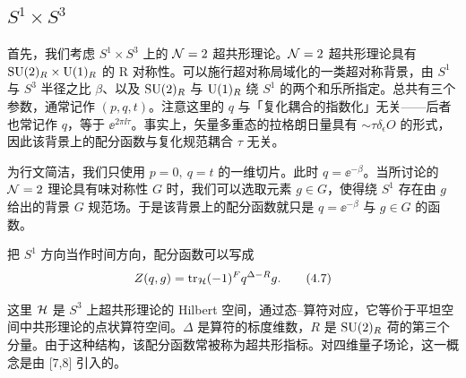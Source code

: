 \subsection{$S^1\times S^3$}

首先，我们考虑 $S^1\times S^3$ 上的 $\mathcal{N}=2$ 超共形理论。$\mathcal{N}=2$ 超共形理论具有 $\mathrm{SU}(2)_R\times\mathrm{U}(1)_R$ 的 R 对称性。可以施行超对称局域化的一类超对称背景，由 $S^1$ 与 $S^3$ 半径之比 $\beta$、以及 $\mathrm{SU}(2)_R$ 与 $\mathrm{U}(1)_R$ 绕 $S^1$ 的两个和乐所指定。总共有三个参数，通常记作 $(p,q,t)$。注意这里的 $q$ 与「复化耦合的指数化」无关——后者也常记作 $q$，等于 $\ee^{2\pi\ii\tau}$。事实上，矢量多重态的拉格朗日量具有 $\sim\tau\delta_\epsilon O$ 的形式，因此该背景上的配分函数与复化规范耦合 $\tau$ 无关。


为行文简洁，我们只使用 $p=0,\ q=t$ 的一维切片。此时 $q=\ee^{-\beta}$。当所讨论的 $\mathcal{N}=2$ 理论具有味对称性 $G$ 时，我们可以选取元素 $g\in G$，使得绕 $S^1$ 存在由 $g$ 给出的背景 $G$ 规范场。于是该背景上的配分函数就只是 $q=\ee^{-\beta}$ 与 $g\in G$ 的函数。

把 $S^1$ 方向当作时间方向，配分函数可以写成
\begin{equation}
Z(q,g)=\operatorname{tr}_{\mathcal{H}}(-1)^F q^{\Delta-R}g.
\tag{4.7}
\end{equation}


这里 $\mathcal{H}$ 是 $S^3$ 上超共形理论的 Hilbert 空间，通过态–算符对应，它等价于平坦空间中共形理论的点状算符空间。$\Delta$ 是算符的标度维数，$R$ 是 $\mathrm{SU}(2)_R$ 荷的第三个分量。由于这种结构，该配分函数常被称为超共形指标。对四维量子场论，这一概念是由 [7,8] 引入的。
